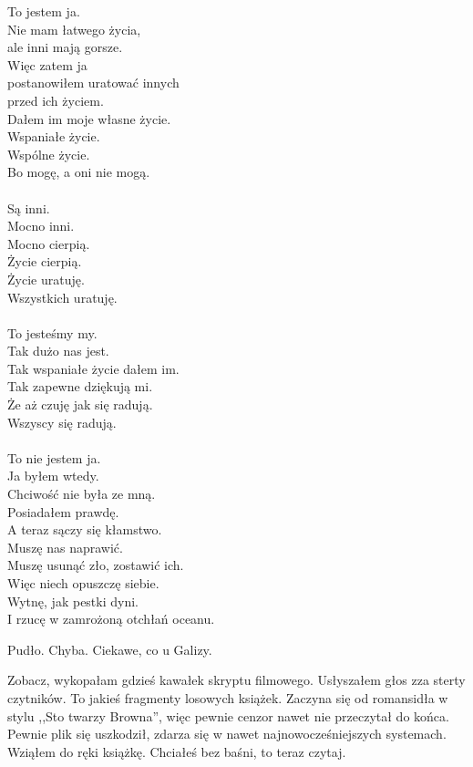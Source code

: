 \begin{poem}
	To jestem ja. \\
	Nie mam łatwego życia, \\
	ale inni mają gorsze. \\
	Więc zatem ja \\
	postanowiłem uratować innych \\
	przed ich życiem. \\
	Dałem im moje własne życie. \\
	Wspaniałe życie. \\
	Wspólne życie. \\
	Bo mogę, a oni nie mogą. \\
	\\
	Są inni. \\
	Mocno inni. \\
	Mocno cierpią. \\
	Życie cierpią. \\
	Życie uratuję. \\
	Wszystkich uratuję. \\
	\\
	To jesteśmy my. \\
	Tak dużo nas jest. \\
	Tak wspaniałe życie dałem im. \\
	Tak zapewne dziękują mi. \\
	Że aż czuję jak się radują. \\
	Wszyscy się radują. \\
	\\
	To nie jestem ja. \\
	Ja byłem wtedy. \\
	Chciwość nie była ze mną. \\
	Posiadałem prawdę. \\
	A teraz sączy się kłamstwo. \\
	Muszę nas naprawić. \\
	Muszę usunąć zło, zostawić ich. \\
	Więc niech opuszczę siebie. \\
	Wytnę, jak pestki dyni. \\
	I rzucę w zamrożoną otchłań oceanu.
\end{poem}

Pudło. Chyba. Ciekawe, co u Galizy.

\begin{dialogue}
	\ds{} Zobacz, wykopałam gdzieś kawałek skryptu filmowego. \dm{} Usłyszałem głos zza sterty czytników. \dm{} To jakieś fragmenty losowych książek.
	Zaczyna się od romansidła w stylu ,,Sto twarzy Browna'', więc pewnie cenzor nawet nie przeczytał do końca.
	\ds{} Pewnie plik się uszkodził, zdarza się w nawet najnowocześniejszych systemach. \dm{} Wziąłem do ręki książkę.
	\ds{} Chciałeś bez baśni, to teraz czytaj.
\end{dialogue}


